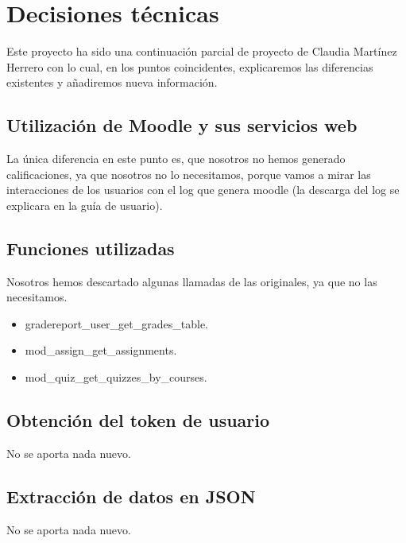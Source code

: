 \section{Decisiones técnicas}\label{decisiones-tecnicas}

Este proyecto ha sido una continuación parcial de proyecto de Claudia Martínez Herrero \cite{claudia} con lo cual, en los puntos coincidentes, explicaremos las diferencias existentes y añadiremos nueva información.

\subsection{Utilización de Moodle y sus servicios web}\label{utilizacióndemoodleysusserviciosweb}

La única diferencia en este punto es, que nosotros no hemos generado calificaciones, ya que nosotros no lo necesitamos, porque vamos a mirar las interacciones de los usuarios con el log que genera moodle (la descarga del log se explicara en la guía de usuario).

\subsection{Funciones utilizadas}\label{funciones-utilizadas}

Nosotros hemos descartado algunas llamadas de las originales, ya que no las necesitamos.

\begin{itemize}
	\tightlist
	\item
	gradereport\_user\_get\_grades\_table.
	\item
	mod\_assign\_get\_assignments.
	\item
	mod\_quiz\_get\_quizzes\_by\_courses.
\end{itemize}

\subsection{Obtención del token de usuario}\label{obtención-del-token-de-usuario}

No se aporta nada nuevo.

\subsection{Extracción de datos en JSON}\label{extracción-de-datos-en-json}

No se aporta nada nuevo.

